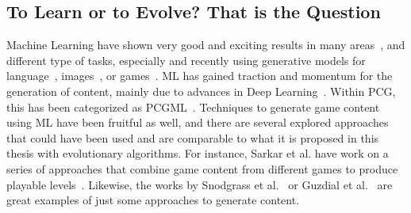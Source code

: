 

\subsection{To Learn or to Evolve? That is the Question}


Machine Learning have shown very good and exciting results in many areas~\cite{canziani_analysis_2016,summerville_procedural_2018}, and different type of tasks, especially and recently using generative models for language~\cite{brown_language_2020}, images~\cite{ramesh_hierarchical_2022,saharia_photorealistic_2022}, or games~\cite{liu_deep_2020}. ML has gained traction and momentum for the generation of content, mainly due to advances in Deep Learning~\cite{lecun_deep_2015}. Within PCG, this has been categorized as PCGML~\cite{summerville_procedural_2018}. Techniques to generate game content using ML have been fruitful as well, and there are several explored approaches that could have been used and are comparable to what it is proposed in this thesis with evolutionary algorithms. For instance, Sarkar et al. have work on a series of approaches that combine game content from different games to produce playable levels~\cite{sarkar_game_2019,sarkar_sequential_2020,sarkar_dungeon_2021}. Likewise, the works by Snodgrass et al.~\cite{snodgrass_levels_2019} or Guzdial et al.~\cite{guzdial_conceptual_2020} are great examples of just some approaches to generate content. 

